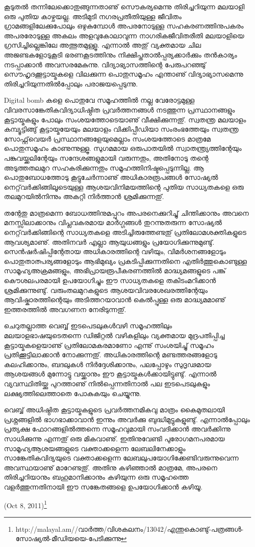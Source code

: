 കൂടുതല്‍ തന്നിലേക്കൊതുങ്ങുന്നതാണു് സൌകര്യമെന്നു തിരിച്ചറിയുന്ന മലയാളി ഒരു പുതിയ കാഴ്ചയല്ല. അടിമുടി നഗരപ്രതീതിയുള്ള
 ജീവിതം ഗ്രാമങ്ങളിലേക്കുപോലും ഒഴുകുമ്പോള്‍ അപരനോടുള്ള സഹകരണത്തിനുപകരം അപരരോടുള്ള അകലം അളവുകോലാവുന്ന 
നാഗരികജീവിതരീതി മലയാളിയെ ഗ്രസിച്ചില്ലെങ്കിലേ അത്ഭുതമുള്ളൂ. എന്നാല്‍ അതു് വ്യക്തമായ ചില അജണ്ടകളോടുകൂടി ഭരണകൂടത്തിനും
 നിക്ഷിപ്തതാല്‍പ്പര്യക്കാര്‍ക്കും തന്‍കാര്യം നടപ്പാക്കാന്‍ അവസരമേകുന്നു. വിദ്യാഭ്യാസത്തിന്റെ പേരുപറഞ്ഞു് സൌഹൃദക്കൂട്ടായ്മകളെ 
വിലക്കുന്ന പൊതുസമൂഹം എന്താണു് വിദ്യാഭ്യാസമെന്നു തിരിച്ചറിയുന്നതില്‍പ്പോലും പരാജയപ്പെടുന്നു.

Digital bomb കളെ പൊതുവേ സമൂഹത്തില്‍ നല്ല വേരോട്ടമുള്ള വിവരസാങ്കേതികവിദ്യാധിഷ്ഠിത പ്രവര്‍ത്തനങ്ങള്‍ നടത്തുന്ന 
പ്രസ്ഥാനങ്ങളും കൂട്ടായ്മകളും പോലും സംശയത്തോടെയാണു് വീക്ഷിക്കുന്നതു്. സ്വതന്ത്ര മലയാളം കമ്പ്യൂട്ടിങ്ങു് കൂട്ടായ്മയേയും മലയാളം 
വിക്കിപ്പീഡിയാ സംരംഭത്തേയും സ്വതന്ത്ര സോഫ്റ്റ്‌വെയര്‍ പ്രസ്ഥാനങ്ങളേയുമെല്ലാം സംശയത്തോടെ മാത്രമേ പൊതുസമൂഹം കാണുന്നുള്ളൂ.
സുഗമമായ ഒരുപാതയില്‍ സ്വാതന്ത്ര്യത്തിന്റേയും പങ്കുവയ്ക്കലിന്റേയും സന്ദേശങ്ങളുമായി വരുന്നതും, അതിനോടു തന്റെ
 അടുത്തതലമുറ സഹകരിക്കുന്നതും സമൂഹത്തിനിഷ്ടപ്പെടുന്നില്ല. ആ പൊതുബോധത്തോടു കൂട്ടുചേര്‍ന്നാണു് അധികാരരൂപങ്ങള്‍ 
സോഷ്യല്‍ നെറ്റ്‌വര്‍ക്കിങ്ങിലൂടെയുള്ള ആശയവിനിമയത്തിന്റെ പുതിയ സാധ്യതകളെ ഒരു തലമുറയില്‍നിന്നും അകറ്റി നിര്‍ത്താന്‍ 
ശ്രമിക്കുന്നതു്.

തന്റേതു മാത്രമെന്ന ബോധത്തിനുമപ്പുറം അപരനെക്കുറിച്ചു് ചിന്തിക്കാനും അവനെ മനസ്സിലാക്കാനും വിപ്ലവകരമായ 
മാര്‍ഗ്ഗങ്ങള്‍ തുറന്നുതരുന്ന സോഷ്യല്‍ നെറ്റ്‌വര്‍ക്കിങ്ങിന്റെ സാധ്യതകളെ അടിച്ചിരുത്തേണ്ടതു് പ്രതിലോമശക്തികളുടെ
 ആവശ്യമാണു്. അതിനവര്‍ എല്ലാ ആയുധങ്ങളും പ്രയോഗിക്കുന്നുമുണ്ടു്. സെന്‍ഷര്‍ഷിപ്പിന്റേതായ അധികാരത്തിന്റെ വഴിയും, 
വിമര്‍ശനങ്ങളോടും പൊതുതാത്പര്യങ്ങളോടും ആഭിമുഖ്യം പ്രകടിപ്പിക്കുന്നതിനെ എതിര്‍ത്തുകൊണ്ടുള്ള സാമൂഹ്യഅക്രമങ്ങളും, 
അഭിപ്രായരൂപീകരണത്തില്‍ മാദ്ധ്യമങ്ങളുടെ പങ്കു് കൌശലപരമായി ഉപയോഗിച്ചും ഈ സാധ്യതകളെ തകിടംമറിക്കാന്‍ 
ശ്രമിക്കുന്നുണ്ടു്. വരുംതലമുറകളുടെ ആശയവിവരശേഖരത്തിന്റേയും ആവിഷ്കാരത്തിന്റെയും അടിത്തറയാവാന്‍ കെല്‍പ്പുള്ള ഒരു 
മാദ്ധ്യമമാണു് ഇത്തരത്തില്‍ അവഗണന നേരിടുന്നതു്.

ചെറുതല്ലാത്ത വെബ്ബ് ഇടപെടലുകള്‍വഴി സമൂഹത്തിലും മലയാളഭാഷയുടെതന്നെ ഡിജിറ്റല്‍ വഴികളിലും വ്യക്തമായ മുദ്രപതിപ്പിച്ച 
കൂട്ടായ്മകളെയാണു് പ്രതിലോമകരമാണോ എന്നു് സംശയിച്ചു് സമൂഹം പ്രതിക്കൂട്ടിലാക്കാന്‍ നോക്കുന്നതു്. അധികാരത്തിന്റെ 
മണ്ടത്തരങ്ങളോടു കലഹിക്കാനും, ബദലുകള്‍ നിര്‍ദ്ദേശിക്കാനും, പലപ്പോഴും സുദൃഢമായ ആശയങ്ങള്‍ മുന്നോട്ടു വയ്ക്കാനും 
ഈ കൂട്ടായ്മകള്‍ക്കായിട്ടുണ്ടു്. എന്നാല്‍ വ്യവസ്ഥിതിയ്ക്കു പുറത്താണു് നില്‍പ്പെന്നതിനാല്‍ പല ഇടപെടലുകളും ലക്ഷ്യത്തിലെത്താതെ
 പോകുകയും ചെയ്യുന്നു.

വെബ്ബ് അധിഷ്ഠിത കൂട്ടായ്മകളുടെ പ്രവര്‍ത്തനമികവു മാത്രം കൈമുതലായി പ്രശ്നങ്ങളില്‍ ഭാഗഭാക്കാവാന്‍ ഇന്നും അവര്‍ക്കു 
ബുദ്ധിമുട്ടുകളുണ്ടു്. എന്നാല്‍പ്പോലും പ്രത്യക്ഷ ഫോറങ്ങളില്‍ത്തന്നെ സമൂഹവുമായി സംവദിക്കാന്‍ അവര്‍ക്കിന്നു സാധിക്കുന്നു 
എന്നതു് ഒരു മികവാണു്. ഇതിനുവേണ്ടി പുരോഗമനപരമായ സാമൂഹ്യആശയങ്ങളുടെ വക്താക്കളെന്ന ലേബലിനേക്കാളും 
സാങ്കേതികവിദ്യയുടെ വക്താക്കളെന്ന ലേബലുപയോഗിക്കേണ്ടിവരുന്നുവെന്ന അവസ്ഥയാണു് മാറേണ്ടതു്. അതിനു കഴിഞ്ഞാല്‍ 
മാത്രമേ, അപരനെ തിരിച്ചറിയാനും ബഹുമാനിക്കാനും കഴിയുന്ന ഒരു സമൂഹത്തെ വളര്‍ത്തുന്നതിനായി ഈ സങ്കേതങ്ങളെ
 ഉപയോഗിക്കാന്‍ കഴിയൂ.

(Oct 8, 2011)\footnote{http://malayal.am//വാര്‍ത്ത/വിശകലനം/13042/എന്തുകൊണ്ടു്-പത്രങ്ങള്‍-സോഷ്യല്‍-മീഡിയയെ-പേടിക്കുന്നു}
\newpage
